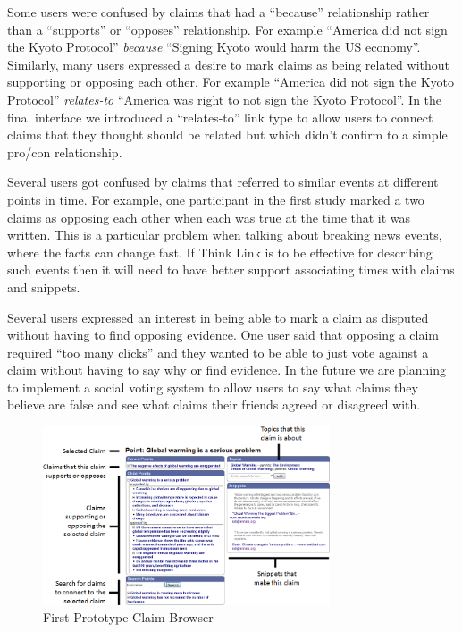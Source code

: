 \documentclass{chi2009}
\begin{document}
Some users were confused by claims that had a ``because'' relationship rather than a ``supports'' or ``opposes'' relationship. For example ``America did not sign the Kyoto Protocol'' {\it because} ``Signing Kyoto would harm the US economy''. Similarly, many users expressed a desire to mark claims as being related without supporting or opposing each other. For example ``America did not sign the Kyoto Protocol'' {\it  relates-to} ``America was right to not sign the Kyoto Protocol''. In the final interface we introduced a ``relates-to'' link type to allow users to connect claims that they thought should be related but which didn't confirm to a simple pro/con relationship. 

Several users got confused by claims that referred to similar events at different points in time. 
For example, one participant in the first study marked a two claims as opposing each other when each was true at the time that it was written. This is a particular problem when talking about breaking news events, where the facts can change fast. If Think Link is to be effective for describing such events then it will need to have better support associating times with claims and snippets.

Several users expressed an interest in being able to mark a claim as disputed without having to find opposing evidence. One user said that opposing a claim required ``too many clicks'' and they wanted to be able to just vote against a claim without having to say why or find evidence. In the future we are planning to implement a social voting system to allow users to say what claims they believe are false and see what claims their friends agreed or disagreed with.

\begin{figure}[tb]
	\includegraphics[width=8.5cm]{../screenshots/oldpoint_diagram.png}
	\caption{First Prototype Claim Browser}
	\label{oldbrowser}
\end{figure}
\end{document}

